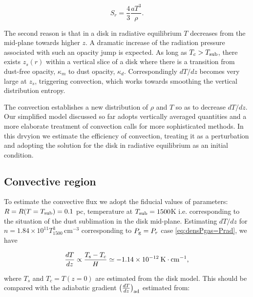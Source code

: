\documentclass[12pt,english,preprint]{aastex}
\newcommand{\su}[2]{#1_{\rm #2}}
\newcommand{\Tsub}{ \su{T}{sub} }
\begin{document}
\begin{equation}
S_{r}=\frac{4}{3}\frac{aT^{3}}{\rho}\mbox{.}\label{eq:EntropyRad}
\end{equation}

The second reason is that in a disk in radiative equilibrium 
$T$ decreases from the mid-plane towards higher $z$.
A dramatic increase of the radiation pressure associated
with such an opacity jump is expected. 
As long as $T_{c}>T_{{\rm sub}}$,
there exists $z_{s}(r)$ within a vertical slice of a disk where there
is a transition from dust-free opacity, $\kappa_{m}$ to dust opacity,
$\kappa_{d}$. Correspondingly $dT/dz$ becomes very large at $z_{s}$, 
triggering convection, which works towards smoothing the vertical distribution 
entropy.

The convection establishes a new distribution of $\rho$ and $T$
so as to decrease $dT/dz$. 
Our simplified model discussed so far adopts vertically averaged
quantities and a 
more elaborate treatment of convection calls for more
sophisticated methods. In this drvyion  we  estimate the efficiency of convection, treating it
as a perturbation and adopting the solution for the disk in radiative equilibrium  as an initial condition.



\subsection{Convective region}

To estimate the convective flux we adopt the fiducial values of parameters:
${\displaystyle R=R(T= \Tsub)= 0.1}$ pc,
temperature at $T_{{\rm sub}}=1500$K i.e. corresponding to the
situation of the dust sublimation in the disk mid-plane. 
Estimating $dT/dz$ for
$n = 1.84\times10^{11}T_{1500}^{3}\,\text{cm}^{-3}$
corresponding to $P_{{\rm g}}=P_r$ case \eqref{eq:densPgas=Prad}, we have
 
\begin{equation}
\frac{dT}{dz}\propto\frac{T_{{\rm s}}-T_{c}}{H}\simeq-1.14\times10^{-12}\:{\rm K}\cdot{\rm cm}^{-1}\mbox{,}\label{eq:dTdz_Model_num}
\end{equation}

\noindent where $T_{s}$ and $T_{c}=T(z=0)$ are estimated from the disk model.
This should be compared with the adiabatic gradient 
$\left(\frac{dT}{dz}\right)_{{\rm ad}}$ estimated from:
\end{document}
